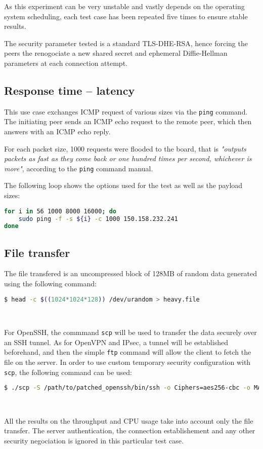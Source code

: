 As this experiment can be very unstable and vastly depends on the operating system scheduling, each test case has been repeated five times to ensure stable results.

The security parameter tested is a standard TLS-DHE-RSA, hence forcing the peers the renogociate a new shared secret and ephemeral Diffie-Hellman parameters at each connection attempt.


\subsection{Response time -- latency}
This use case exchanges ICMP request of various sizes via the \texttt{ping} command.
The initiating peer sends an ICMP echo request to the remote peer, which then answers with an ICMP echo reply.

\noindent For each packet size, 1000 requests were flooded to the board, that is \textit{"outputs packets as fast as they come back or one hundred times per second, whichever is more"}, according to the \texttt{ping} command manual.

The following loop shows the options used for the test as well as the payload sizes:
\begin{lstlisting}[language=bash]
for i in 56 1000 8000 16000; do
	sudo ping -f -s ${i} -c 1000 150.158.232.241
done
\end{lstlisting}

\subsection{File transfer}
The file transfered is an uncompressed block of 128MB of random data generated using the following command:
\begin{lstlisting}[language=bash]
  $ head -c $((1024*1024*128)) /dev/urandom > heavy.file
\end{lstlisting}~\newline{}

For OpenSSH, the commmand \texttt{scp} will be used to transfer the data securely over an SSH tunnel.
As for OpenVPN and IPsec, a tunnel will be established beforehand, and then the simple \texttt{ftp} command will allow the client to fetch the file on the server.
In order to use custom temporary security configuration with \texttt{scp}, the following command can be used:
\begin{lstlisting}[language=bash]
  $ ./scp -S /path/to/patched_openssh/bin/ssh -o Ciphers=aes256-cbc -o MACs=none@barco.com root@150.158.232.241:heavy.file .
\end{lstlisting}~\newline{}


All the results on the throughput and CPU usage take into account only the file transfer.
The server authentication, the connection establishement and any other security negociation is ignored in this particular test case.